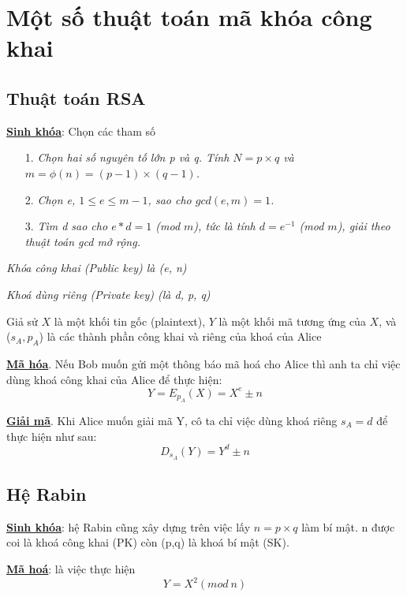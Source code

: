 \documentclass[a4paper,12pt]{report}
\begin{document}
\section{Một số thuật toán mã khóa công khai}
\subsection*{Thuật toán RSA}
\textbf{\underline{Sinh khóa}}: Chọn các tham số
\begin{itemize}
\item[1. ] \textit{Chọn hai số nguyên tố lớn p và q. Tính $N	 = p \times q$ và $m = \phi(n) = (p - 1) \times (q - 1)$.}
\item[2. ] \textit{Chọn e, $1 \leq e \leq m -1$, sao cho $gcd(e, m) = 1$.}
\item[3. ] \textit{Tìm d sao cho $e * d = 1$ (mod $m$), tức là tính $d = e^{-1}$
(mod $m$), giải theo thuật toán gcd mở rộng.}
\end{itemize}

\textit{Khóa công khai (Public key) là (e, n)}

\textit{Khoá dùng riêng (Private key) (là d, p, q)}

Giả sử $X$ là một khối tin gốc (plaintext), $Y$ là một khối mã tương ứng của $X$, và ($s_A, p_A$) là các thành phần công khai và riêng của khoá của Alice

\textbf{\underline{Mã hóa}}. Nếu Bob muốn gửi một thông báo mã hoá cho Alice thì anh ta chỉ việc dùng khoá công khai của Alice để thực hiện:
\begin{displaymath}
Y = E_{p_A}(X) = X^e \pm n
\end{displaymath}

\textbf{\underline{Giải mã}}. Khi Alice muốn giải mã Y, cô ta chỉ việc dùng khoá riêng $s_A = d$ để thực hiện như sau:
\begin{displaymath}
D_{s_A}(Y) = Y^d \pm n
\end{displaymath}
\subsection*{Hệ Rabin}
\textbf{\underline{Sinh khóa}}: hệ Rabin cũng xây dựng trên việc lấy $n=p\times q$ làm bí mật. n được coi là khoá công khai (PK) còn (p,q) là khoá bí mật (SK).

\textbf{\underline{Mã hoá}}: là việc thực hiện
\begin{displaymath}
Y = X^2 (mod \ n)
\end{displaymath}
\end{document}
